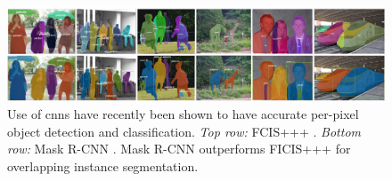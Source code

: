 \begin{figure}[p]
  \centering
  \includegraphics[width=\textwidth]{images/background/he2017_maskrcnn}
  \caption[Use of CNNs for object detection]{Use of \glspl{cnn} have recently been shown to have accurate per-pixel object detection and classification. \textit{Top row:} FCIS+++ \citep{Li:2016uj}. \textit{Bottom row:} Mask R-CNN \citep{He:2017ud}. Mask R-CNN outperforms FICIS+++ for overlapping instance segmentation.}
  \label{fig:background:detection:learning:he2017_maskrcnn}
\end{figure}

\clearpage
